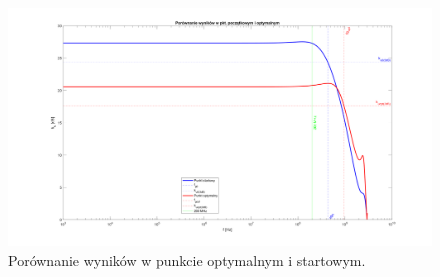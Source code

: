 \documentclass{article}
\begin{document}
\pagebreak
\begin{landscape}
	\begin{figure}[h]
		\vspace*{-2cm}
		\includegraphics[width=25cm,height=15 cm]{graphics/comparison.png}
		\centering
		\caption{Porównanie wyników w punkcie optymalnym i startowym.}
	\end{figure}
\end{landscape}
\end{document}
